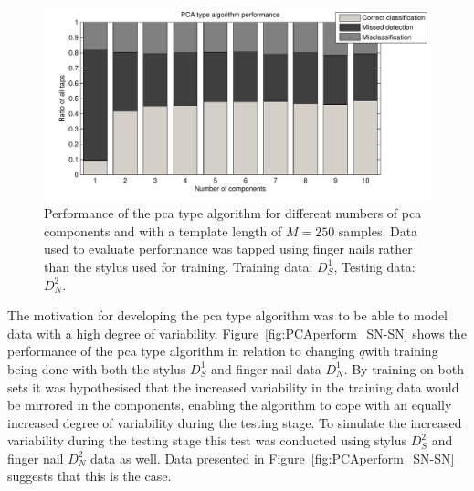 \begin{figure}[!] %
\centering
\includegraphics[width=150mm]{PCAperformNail.pdf}
\caption{Performance of the \DIFdelbeginFL {}\DIFdelendFL \DIFaddbeginFL \gls{pca} \DIFaddendFL type algorithm for different numbers of \DIFdelbeginFL {}\DIFdelendFL \DIFaddbeginFL \gls{pca} \DIFaddendFL components and with a template length of $M=250$ samples. Data used to evaluate performance was tapped using finger nails rather than the stylus used for training. Training data: $D^1_S$, Testing data: $D^2_N$.}\label{fig:PCAperformNail}
\end{figure}

The motivation for developing the \DIFdelbegin {}\DIFdelend \DIFaddbegin \gls{pca} \DIFaddend type algorithm was to be able to model data with a high degree of variability. Figure~\ref{fig:PCAperform_SN-SN} shows the performance of the \DIFdelbegin {}\DIFdelend \DIFaddbegin \gls{pca} \DIFaddend type algorithm in relation to changing $q$\DIFaddbegin \DIFadd{, }\DIFaddend with training being done with both the stylus $D^1_S$ and finger nail data $D^1_N$. By training on both sets it was hypothesised that the increased variability in the training data would be mirrored in the components, enabling the algorithm to cope with an equally increased degree of variability during the testing stage. To simulate the increased variability during the testing stage this test was conducted using stylus $D^2_S$ and finger nail $D^2_N$ data as well. Data presented in Figure~\ref{fig:PCAperform_SN-SN} suggests that this is the case.

